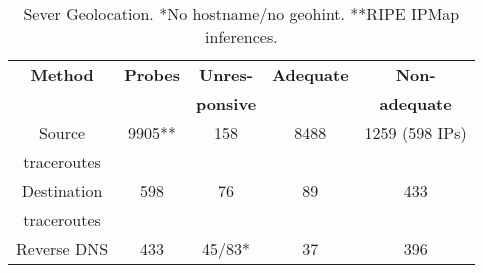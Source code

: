 \begin{table}
  \caption{Sever Geolocation. *No hostname/no geohint. **RIPE IPMap inferences.}
  \label{tab:servergeo}
  \begin{tabular}{ccccc}
    \toprule
    \textbf{Method} & \textbf{Probes} & \textbf{Unres-} & \textbf{Adequate} & \textbf{Non-}\\
     &  & \textbf{ponsive} &  & \textbf{adequate}\\
    \toprule
    Source& 9905**  & 158 &  8488 & 1259 (598 IPs)\\
    traceroutes &   &  &   & \\
    \midrule
    Destination &598 & 76 & 89 & 433\\
    traceroutes &   &  &   & \\
    \midrule
    Reverse DNS & 433 & 45/83* & 37 & 396 \\

  \bottomrule
\end{tabular}
\end{table}

